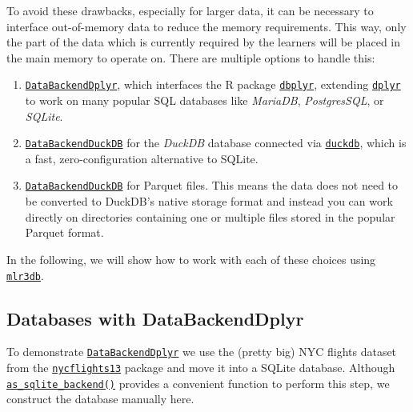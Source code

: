 To avoid these drawbacks, especially for larger data, it can be
necessary to interface out-of-memory data to reduce the memory
requirements. This way, only the part of the data which is currently
required by the learners will be placed in the main memory to operate
on. There are multiple options to handle this:

\begin{enumerate}
\def\labelenumi{\arabic{enumi}.}
\tightlist
\item
  \href{https://mlr3db.mlr-org.com/reference/DataBackendDplyr.html}{\texttt{DataBackendDplyr}},
  which interfaces the R package
  \href{https://cran.r-project.org/package=dbplyr}{\texttt{dbplyr}},
  extending
  \href{https://cran.r-project.org/package=dplyr}{\texttt{dplyr}} to
  work on many popular SQL databases like \emph{MariaDB},
  \emph{PostgresSQL}, or \emph{SQLite}.
\item
  \href{https://mlr3db.mlr-org.com/reference/DataBackendDuckDB.html}{\texttt{DataBackendDuckDB}}
  for the \emph{DuckDB} database connected via
  \href{https://cran.r-project.org/package=duckdb}{\texttt{duckdb}},
  which is a fast, zero-configuration alternative to
  SQLite.
\item
  \href{https://mlr3db.mlr-org.com/reference/DataBackendDuckDB.html}{\texttt{DataBackendDuckDB}}
  for Parquet files. This means the data does not need to
  be converted to DuckDB's native storage format and instead you can
  work directly on directories containing one or multiple files stored
  in the popular Parquet format.
\end{enumerate}

In the following, we will show how to work with each of these choices
using
\href{https://mlr3db.mlr-org.com}{\texttt{mlr3db}}.

\hypertarget{databases-with-databackenddplyr}{%
\subsection{Databases with
DataBackendDplyr}\label{databases-with-databackenddplyr}}

To demonstrate
\href{https://mlr3db.mlr-org.com/reference/DataBackendDplyr.html}{\texttt{DataBackendDplyr}}
we use the (pretty big) NYC flights dataset from the
\href{https://cran.r-project.org/package=nycflights13}{\texttt{nycflights13}}
package and move it into a SQLite database. Although
\href{https://mlr3db.mlr-org.com/reference/as_sqlite_backend.html}{\texttt{as\_sqlite\_backend()}}
provides a convenient function to perform this step, we construct the
database manually here.


